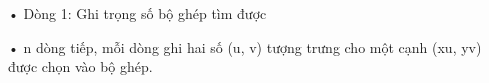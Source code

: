 • Dòng 1: Ghi trọng số bộ ghép tìm được   


   • n dòng tiếp, mỗi dòng ghi hai số (u, v) tượng trưng cho một cạnh (xu, yv) được chọn vào bộ ghép.